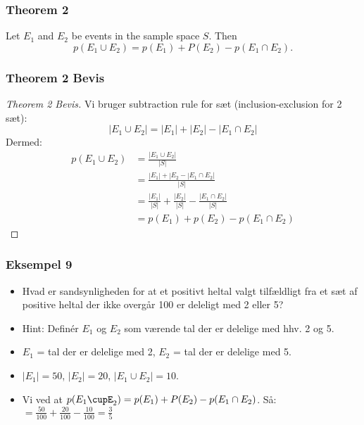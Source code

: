 \documentclass{beamer}
\begin{document}
\begin{frame}
  \frametitle{Theorem 2}
  \begin{theorem}
Let $E_{1}$ and $E_{2}$ be events in the sample space $S$. Then $$p(E_{1} \cup E_{2}) = p(E_{1})+P(E_{2})-p(E_{1} \cap E_{2}).$$
  \end{theorem} 
\end{frame}

\begin{frame}
  \frametitle{Theorem 2 Bevis}
  \begin{proof}[Theorem 2 Bevis]
    Vi bruger subtraction rule for sæt (inclusion-exclusion for 2 sæt):
    $$|E_{1} \cup E_{2}| = |E_{1}| + |E_{2}| - |E_{1} \cap E_{2}|$$
    Dermed:
    \begin{equation*}
      \begin{split}
        p(E_{1} \cup E_{2}) &= \frac{|E_{1} \cup E_{2}|}{|S|}\\
                         &= \frac{|E_{1}|+|E_{2}-|E_{1}\cap E_{2}|}{|S|}\\
                         &= \frac{|E_{1}|}{|S|} + \frac{|E_{2}|}{|S|}- \frac{|E_{1} \cap E_{2}|}{|S|}\\
        &= p(E_{1})+p(E_{2})-p(E_{1} \cap E_{2})
      \end{split}
    \end{equation*}
  \end{proof}
\end{frame}

\begin{frame}
  \frametitle{Eksempel 9}
 \begin{itemize}
 \item<1-> Hvad er sandsynligheden for at et positivt heltal valgt tilfældligt fra et sæt af positive heltal der ikke overgår 100 er deleligt med 2 eller 5?
 \item<1-> Hint: Definér $E_{1}$ og $E_{2}$ som værende tal der er delelige med hhv. 2 og 5.
 \item<2-> $E_{1}$ = tal der er delelige med 2, $E_{2}$ = tal der er delelige med 5.
 \item<3-> $|E_{1}| = 50$, $|E_{2}| = 20$, $|E_{1} \cup E_{2}| = 10$.
 \item<3-> Vi ved at $p(E_{1}\cupE_{2})=p(E_{1})+P(E_{2})-p(E_{1} \cap E_{2})$. Så: $= \frac{50}{100}+ \frac{20}{100}- \frac{10}{100} = \frac{3}{5}$
     
 \end{itemize} 
\end{frame}
\end{document}
